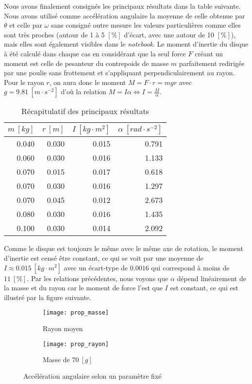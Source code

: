 Nous avons finalement consignés les principaux résultats dans la table suivante. Nous avons utilisé comme accélération angulaire la moyenne de celle obtenue par $\theta$ et celle par $\omega$ sans consigné outre mesure les valeurs particulières comme elles sont très proches (autour de 1 à 5 $[\%]$ d'écart, avec une autour de 10 $[\%]$), mais elles sont également visibles dans le \textit{notebook}. Le moment d’inertie du disque à été calculé dans chaque cas en considérant que la seul force $F$ créant un moment est celle de pesanteur du contrepoids de masse $m$ parfaitement redirigée par une poulie sans frottement et s'appliquant perpendiculairement au rayon. Pour le rayon $r$, on aura donc le moment $M = F \cdot r = mgr$ avec $g = 9.81 \ [m \cdot s^{-2}]$ d'où la relation $M=I\alpha \Leftrightarrow I = \frac{M}{\alpha}$.

\begin{table}[H]
\centering
\begin{tabular}{rrrr}
\toprule
 $m \ [kg]$ &  $r \ [m]$ &  $I \ [kg \cdot m^2]$ &  $\alpha \ [rad \cdot s^{-2}]$ \\
\midrule
  0.040 &  0.030 &      0.015 &            0.791 \\
  0.060 &  0.030 &      0.016 &            1.133 \\
  0.070 &  0.015 &      0.017 &            0.618 \\
  0.070 &  0.030 &      0.016 &            1.297 \\
  0.070 &  0.045 &      0.012 &            2.673 \\
  0.080 &  0.030 &      0.016 &            1.435 \\
  0.100 &  0.030 &      0.014 &            2.092 \\
\bottomrule
\end{tabular}
\caption{Récapitulatif des principaux résultats}
\label{tab:recap}
\end{table}

Comme le disque est toujours le même avec le même axe de rotation, le moment d'inertie est censé être constant, ce qui se voit par une moyenne de $I \approx 0.015 \ [kg \cdot m^2]$ avec un écart-type de $0.0016$ qui correspond à moins de $11 \ [\%]$. Par les relations précédentes, nous voyons que $\alpha$ dépend linéairement de la masse et du rayon car le moment de force l'est que $I$ est constant, ce qui est illustré par la figure suivante.

\begin{figure}[H]
\centering
\begin{subfigure}[t]{.45\linewidth}
\centering
\texttt{[image: prop\_masse]}
\caption{Rayon moyen}
\end{subfigure}
\begin{subfigure}[t]{.45\linewidth}
\centering
\texttt{[image: prop\_rayon]}
\caption{Masse de $70 \ [g]$}
\end{subfigure}
\caption{Accélération angulaire selon un paramètre fixé}
\label{fig:prop}
\end{figure}
